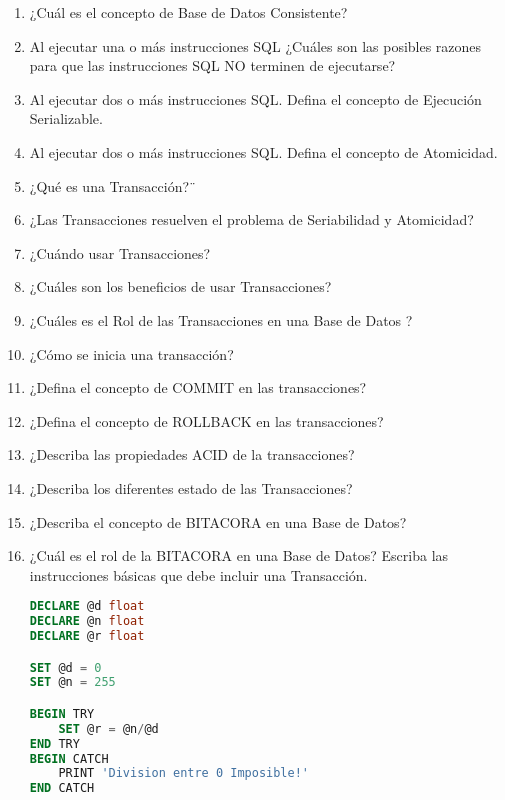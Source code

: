 \begin{enumerate}
\item ¿Cuál es el concepto de Base de Datos Consistente?

\item Al ejecutar una o más instrucciones SQL ¿Cuáles son las posibles razones para que las instrucciones SQL NO terminen de ejecutarse?
\item Al ejecutar dos o más instrucciones SQL. Defina el concepto de Ejecución Serializable.
\item Al ejecutar dos o más instrucciones SQL. Defina el concepto de Atomicidad.
\item ¿Qué es una Transacción?¨
\item ¿Las Transacciones resuelven el problema de Seriabilidad y Atomicidad?
\item ¿Cuándo usar Transacciones?
\item ¿Cuáles son los beneficios de usar Transacciones?
\item ¿Cuáles es el Rol de las Transacciones en una Base de Datos ?
\item ¿Cómo se inicia una transacción?
\item ¿Defina el concepto de COMMIT en las transacciones?
\item ¿Defina el concepto de ROLLBACK en las transacciones?
\item ¿Describa las propiedades ACID de la transacciones?
\item ¿Describa los diferentes estado de las Transacciones?
\item ¿Describa el concepto de BITACORA en una Base de Datos?
\item ¿Cuál es el rol de la BITACORA en una Base de Datos?
Escriba las instrucciones básicas que debe incluir una Transacción. 
\begin{lstlisting}[language=SQL]
DECLARE @d float
DECLARE @n float
DECLARE @r float

SET @d = 0
SET @n = 255

BEGIN TRY
	SET @r = @n/@d
END TRY
BEGIN CATCH
	PRINT 'Division entre 0 Imposible!'
END CATCH
\end{lstlisting}
\end{enumerate}
